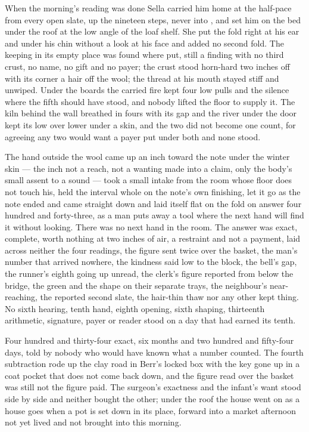 When the morning's reading was done Sella carried him home at the half-pace from every open slate, up the nineteen steps, never into , and set him on the bed under the roof at the low angle of the loaf shelf. She put the fold right at his ear and under his chin without a look at his face and added no second fold. The keeping in its empty place was found where put, still a finding with no third crust, no name, no gift and no payer; the crust stood horn-hard two inches off with its corner a hair off the wool; the thread at his mouth stayed stiff and unwiped. Under the boards the carried fire kept four low pulls and the silence where the fifth should have stood, and nobody lifted the floor to supply it. The kiln behind the wall breathed in fours with its gap and the river under the door kept its low over lower under a skin, and the two did not become one count, for agreeing any two would want a payer put under both and none stood.

The hand outside the wool came up an inch toward the note under the winter skin --- the inch not a reach, not a wanting made into a claim, only the body's small assent to a sound --- took a small intake from the room whose floor does not touch his, held the interval whole on the note's own finishing, let it go as the note ended and came straight down and laid itself flat on the fold on answer four hundred and forty-three, as a man puts away a tool where the next hand will find it without looking. There was no next hand in the room. The answer was exact, complete, worth nothing at two inches of air, a restraint and not a payment, laid across neither the four readings, the figure sent twice over the basket, the man's number that arrived nowhere, the kindness said low to the block, the bell's gap, the runner's eighth going up unread, the clerk's figure reported from below the bridge, the green and the shape on their separate trays, the neighbour's near-reaching, the reported second slate, the hair-thin thaw nor any other kept thing. No sixth hearing, tenth hand, eighth opening, sixth shaping, thirteenth arithmetic, signature, payer or reader stood on a day that had earned its tenth.

Four hundred and thirty-four exact, six months and two hundred and fifty-four days, told by nobody who would have known what a number counted. The fourth subtraction rode up the clay road in Berr's locked box with the key gone up in a coat pocket that does not come back down, and the figure read over the basket was still not the figure paid. The surgeon's exactness and the infant's want stood side by side and neither bought the other; under the roof the house went on as a house goes when a pot is set down in its place, forward into a market afternoon not yet lived and not brought into this morning.

